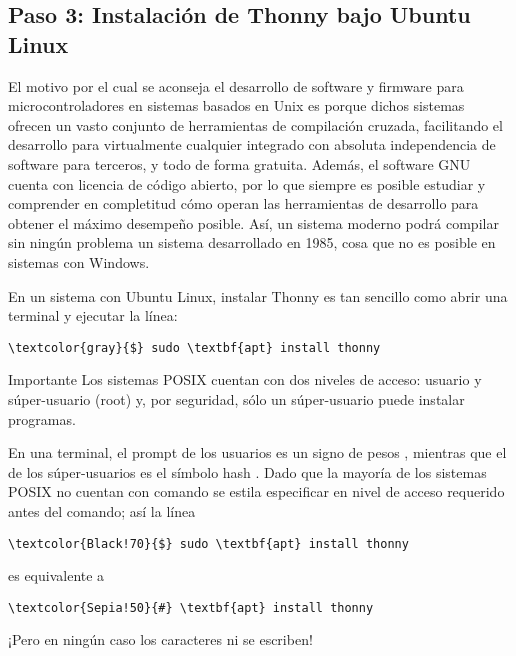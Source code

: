 %
%



\subsection{Paso 3: Instalación de Thonny bajo Ubuntu Linux}%
\label{sec:step3}
El motivo por el cual se aconseja el desarrollo de software y firmware para microcontroladores en sistemas basados en Unix es porque dichos sistemas ofrecen un vasto conjunto de herramientas de compilación cruzada, facilitando el desarrollo para virtualmente cualquier integrado con absoluta independencia de software para terceros, y todo de forma gratuita.
Además, el software GNU cuenta con licencia de código abierto, por lo que siempre es posible estudiar y comprender en completitud cómo operan las herramientas de desarrollo para obtener el máximo desempeño posible.
Así, un sistema moderno podrá compilar sin ningún problema un sistema desarrollado en 1985, cosa que no es posible en sistemas con Windows.

\medskip{}

\noindent
En un sistema con Ubuntu Linux, instalar Thonny es tan sencillo como abrir una terminal y ejecutar la línea:

\begin{Verbatim}[commandchars=\\\{\}]
\textcolor{gray}{$} sudo \textbf{apt} install thonny
\end{Verbatim}

\begin{importantbox}{Importante}
	Los sistemas POSIX cuentan con dos niveles de acceso: usuario y súper-usuario (root) y, por seguridad, sólo un súper-usuario puede instalar programas.

	En una terminal, el prompt de los usuarios es un signo de pesos \code{\$}, mientras que el de los súper-usuarios es el símbolo hash \code{\#}.
	Dado que la mayoría de los sistemas POSIX no cuentan con comando  se estila especificar en nivel de acceso requerido antes del comando; así la línea

	\begin{Verbatim}[commandchars=\\\{\},gobble=2]
		\textcolor{Black!70}{$} sudo \textbf{apt} install thonny
	\end{Verbatim}

	es equivalente a

	\begin{Verbatim}[commandchars=\\\{\},gobble=2]
		\textcolor{Sepia!50}{#} \textbf{apt} install thonny
	\end{Verbatim}

	¡Pero en ningún caso los caracteres \code{\$} ni \code{\#} se escriben!
\end{importantbox}

